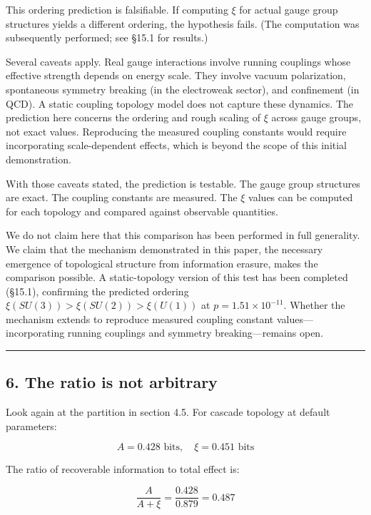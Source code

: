 \documentclass[
  11pt,
  a4paper]{article}
\begin{document}
This ordering prediction is falsifiable. If computing \(\xi\) for actual
gauge group structures yields a different ordering, the hypothesis
fails. (The computation was subsequently performed; see §15.1 for
results.)

Several caveats apply. Real gauge interactions involve running couplings
whose effective strength depends on energy scale. They involve vacuum
polarization, spontaneous symmetry breaking (in the electroweak sector),
and confinement (in QCD). A static coupling topology model does not
capture these dynamics. The prediction here concerns the ordering and
rough scaling of \(\xi\) across gauge groups, not exact values.
Reproducing the measured coupling constants would require incorporating
scale-dependent effects, which is beyond the scope of this initial
demonstration.

With those caveats stated, the prediction is testable. The gauge group
structures are exact. The coupling constants are measured. The \(\xi\)
values can be computed for each topology and compared against observable
quantities.

We do not claim here that this comparison has been performed in full
generality. We claim that the mechanism demonstrated in this paper, the
necessary emergence of topological structure from information erasure,
makes the comparison possible. A static-topology version of this test
has been completed (§15.1), confirming the predicted ordering
\(\xi(SU(3)) > \xi(SU(2)) > \xi(U(1))\) at \(p = 1.51 \times 10^{-11}\).
Whether the mechanism extends to reproduce measured coupling constant
values---incorporating running couplings and symmetry breaking---remains
open.

\begin{center}\rule{0.5\linewidth}{0.5pt}\end{center}

\subsection{6. The ratio is not
arbitrary}\label{the-ratio-is-not-arbitrary}

Look again at the partition in section 4.5. For cascade topology at
default parameters:

\[A = 0.428 \text{ bits}, \quad \xi = 0.451 \text{ bits}\]

The ratio of recoverable information to total effect is:

\[\frac{A}{A + \xi} = \frac{0.428}{0.879} = 0.487\]
\end{document}
